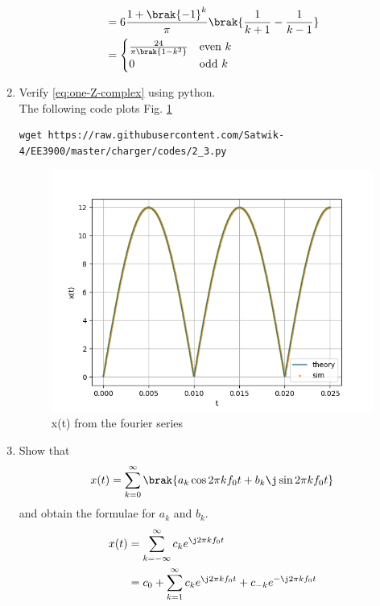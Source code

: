 \documentclass[journal,12pt,twocolumn]{IEEEtran}
\renewcommand\thesection{\arabic{section}}
\begin{document}
\begin{enumerate}[label=\thesection.\arabic*,ref=\thesection.\theenumi]
\begin{align}
        &= 6\frac{1+\brak{-1}^k}{\pi}\brak{\frac{1}{k+1} - \frac{1}{k-1}} \\
        &= 
        \begin{cases}
            \frac{24}{\pi\brak{1-k^2}} & \text{even}\ k \\
            0 &  \text{odd} \ k
        \end{cases}
	\end{align}
\item Verify 
	\eqref{eq:one-Z-complex}
	using python.\\\solution The following code plots Fig. \ref{fig:xt-sim}
	\begin{lstlisting}
wget https://raw.githubusercontent.com/Satwik-4/EE3900/master/charger/codes/2_3.py
\end{lstlisting}
	\begin{figure}[h!]
	    \centering
	    \includegraphics[width=\columnwidth]{figures/xt-sim.png}
	    \caption{x(t) from the fourier series}
	    \label{fig:xt-sim}
	\end{figure}
	\item Show that 
\begin{align}
	x(t) = \sum_{k = 0}^{\infty}\brak{a_k\cos{2\pi kf_0 t}+b_k\j\sin{2\pi kf_0 t}}
\label{eq:one-Z-real}
\end{align}
and obtain the formulae for $a_k$ and $b_k$.
\\\solution
\begin{align}
    x(t) &= \sum_{k = -\infty}^{\infty}c_ke^{\j2\pi kf_0 t} \\
         &= c_0 + \sum_{k = 1}^{\infty}c_ke^{\j2\pi kf_0t} + c_{-k}e^{-\j2\pi kf_0t} \\

\end{align}
\end{enumerate}
\end{document}
